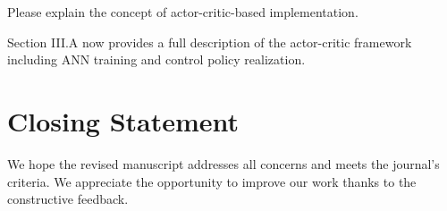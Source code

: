 \documentclass[a4paper,11pt]{article}
\begin{document}

\begin{question}
Please explain the concept of actor-critic-based implementation.
\end{question}
\begin{answer}
Section III.A now provides a full description of the actor-critic framework including ANN training and control policy realization.
\end{answer}

\vspace{2em}

\section*{Closing Statement}
We hope the revised manuscript addresses all concerns and meets the journal's criteria. We appreciate the opportunity to improve our work thanks to the constructive feedback.

\end{document}
